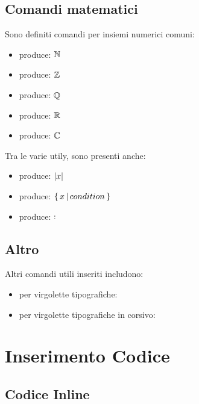 \documentclass{csnotes}
\begin{document}
\subsection{Comandi matematici}

Sono definiti comandi per insiemi numerici comuni:
\begin{itemize}
    \item {} produce: \(\mathbb{N}\)
    \item {} produce: \(\mathbb{Z}\)
    \item {} produce: \(\mathbb{Q}\)
    \item {} produce: \(\mathbb{R}\)
    \item {} produce: \(\mathbb{C}\)
\end{itemize}

Tra le varie utily, sono presenti anche:
\begin{itemize}
    \item {} produce: \(\left|x\right|\)
    \item {} produce: \(\set{x}[condition]\)
    \item {} produce: \(:\)
\end{itemize}

\subsection{Altro}

Altri comandi utili inseriti includono:
\begin{itemize}
    \item {} per virgolette tipografiche: 
    \item {} per virgolette tipografiche in corsivo: 
\end{itemize}


\section{Inserimento Codice}

\subsection{Codice Inline}
\end{document}
